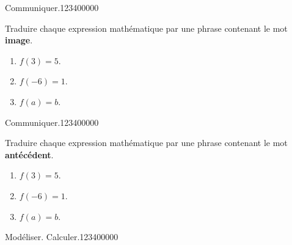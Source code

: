 \begin{pageParcoursu} 

 

\begin{ExoCu}{Communiquer.}{1234}{0}{0}{0}{0}{0}

Traduire chaque expression mathématique par une phrase contenant le mot \textbf{image}.

\begin{enumerate}[leftmargin=*]
\item $f(3)=5$. 
\item $f(-6)=1$.
\item $f(a)=b$. 
\end{enumerate}
\end{ExoCu}


\begin{ExoCu}{Communiquer.}{1234}{0}{0}{0}{0}{0}

Traduire chaque expression mathématique par une phrase contenant le mot \textbf{antécédent}.

\begin{enumerate}[leftmargin=*]
\item $f(3)=5$. 
\item $f(-6)=1$.
\item $f(a)=b$. 
\end{enumerate}
\end{ExoCu}


 \begin{ExoCu}{Modéliser. Calculer.}{1234}{0}{0}{0}{0}{0}
 
\end{ExoCu}



 
\end{pageParcoursu}

  



